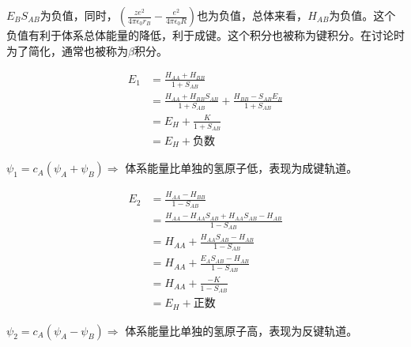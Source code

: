$E_BS_{AB}$为负值，同时，$\left(\frac{ze^2}{4\pi\epsilon_0r_B} - \frac{e^2}{4\pi\epsilon_0R} \right)$也为负值，总体来看，$H_{AB}$为负值。这个负值有利于体系总体能量的降低，利于成键。这个积分也被称为键积分。在讨论时为了简化，通常也被称为$\beta$积分。


\begin{align*}
    E_1 & = \frac{H_{AA} + H_{BB}}{1 + S_{AB}}                                               \\
        & = \frac{H_{AA} + H_{BB}S_{AB}}{1 + S_{AB}} + \frac{H_{BB} - S_{AB}E_B}{1 + S_{AB}} \\
        & = E_H + \frac{K}{1 + S_{AB}}                                                       \\
        & = E_H + \mbox{负数}
\end{align*}

$\psi_1 = c_A \left( \psi_A + \psi_B \right) \Rightarrow$ 体系能量比单独的氢原子低，表现为成键轨道。

\begin{align*}
    E_2 & = \frac{H_{AA} - H_{BB}}{1 - S_{AB}}                               \\
        & = \frac{H_{AA} - H_{AA}S_{AB} + H_{AA}S_{AB} - H_{AB}}{1 - S_{AB}} \\
        & = H_{AA} + \frac{H_{AA}S_{AB} - H_{AB}}{1 - S_{AB}}                \\
        & = H_{AA} + \frac{E_AS_{AB} - H_{AB}}{1 - S_{AB}}                   \\
        & = H_{AA} + \frac{-K}{1 - S_{AB}}                                   \\
        & = E_H + \mbox{正数}
\end{align*}

$\psi_2 = c_A \left( \psi_A - \psi_B \right) \Rightarrow$ 体系能量比单独的氢原子高，表现为反键轨道。

